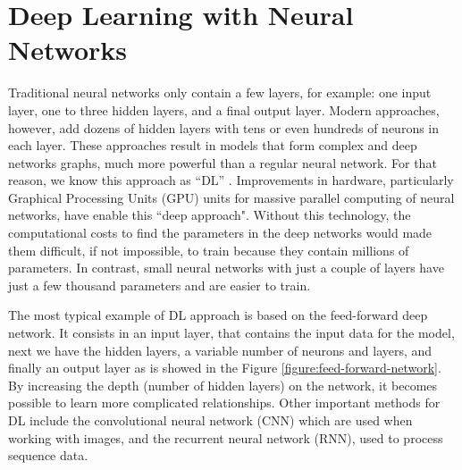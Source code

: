 \documentclass[12pt]{report}
\begin{document}
\section{Deep Learning with Neural Networks}

%

Traditional neural networks only contain a few layers, for example: one input layer, one to three hidden layers, and a final output layer. 
Modern approaches,
however, add dozens of hidden layers with tens or even hundreds of neurons in each layer. These approaches result in models that
form complex and deep networks graphs, much more powerful  than a regular neural network. For that reason,  we know this approach as ``\ac{DL}'' \cite{Goodfellow2016,Nevala2017,Chandra2017}. Improvements in hardware, particularly Graphical Processing Units (GPU) units for massive parallel computing of neural networks,  have enable this ``deep approach". Without this technology, the computational costs to find the parameters in the deep networks would made them difficult, if not impossible, to train because they contain millions of parameters. In contrast, small 
neural networks with just a couple of layers have just a few thousand parameters and are easier to train. 

The most typical example of \ac{DL} approach is based on the feed-forward deep network. It consists in an input layer, that contains the input data for the model, next we have the hidden layers, a variable number of neurons and layers, and finally an output layer as is showed in the Figure \ref{figure:feed-forward-network}. By increasing the depth (number of hidden layers) on the network, it becomes possible to learn more complicated relationships. 
Other important methods for  \ac{DL} include the convolutional neural network (\ac{CNN}) which are used  when working with images,  and the 
recurrent neural network (\ac{RNN}),  used to process sequence data. 
\end{document}
